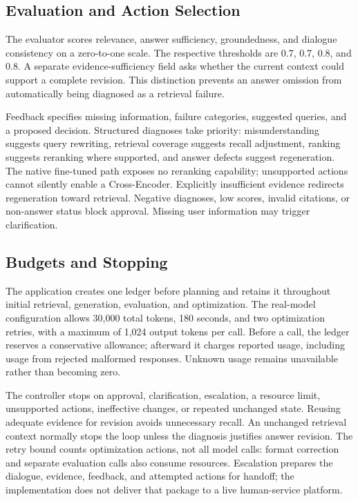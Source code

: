 \subsection{Evaluation and Action Selection}
The evaluator scores relevance, answer sufficiency, groundedness, and dialogue consistency on a zero-to-one scale. The respective thresholds are 0.7, 0.7, 0.8, and 0.8. A separate evidence-sufficiency field asks whether the current context could support a complete revision. This distinction prevents an answer omission from automatically being diagnosed as a retrieval failure.

Feedback specifies missing information, failure categories, suggested queries, and a proposed decision. Structured diagnoses take priority: misunderstanding suggests query rewriting, retrieval coverage suggests recall adjustment, ranking suggests reranking where supported, and answer defects suggest regeneration. The native fine-tuned path exposes no reranking capability; unsupported actions cannot silently enable a Cross-Encoder. Explicitly insufficient evidence redirects regeneration toward retrieval. Negative diagnoses, low scores, invalid citations, or non-answer status block approval. Missing user information may trigger clarification.

\subsection{Budgets and Stopping}
The application creates one ledger before planning and retains it throughout initial retrieval, generation, evaluation, and optimization. The real-model configuration allows 30,000 total tokens, 180 seconds, and two optimization retries, with a maximum of 1,024 output tokens per call. Before a call, the ledger reserves a conservative allowance; afterward it charges reported usage, including usage from rejected malformed responses. Unknown usage remains unavailable rather than becoming zero.

The controller stops on approval, clarification, escalation, a resource limit, unsupported actions, ineffective changes, or repeated unchanged state. Reusing adequate evidence for revision avoids unnecessary recall. An unchanged retrieval context normally stops the loop unless the diagnosis justifies answer revision. The retry bound counts optimization actions, not all model calls: format correction and separate evaluation calls also consume resources. Escalation prepares the dialogue, evidence, feedback, and attempted actions for handoff; the implementation does not deliver that package to a live human-service platform.
